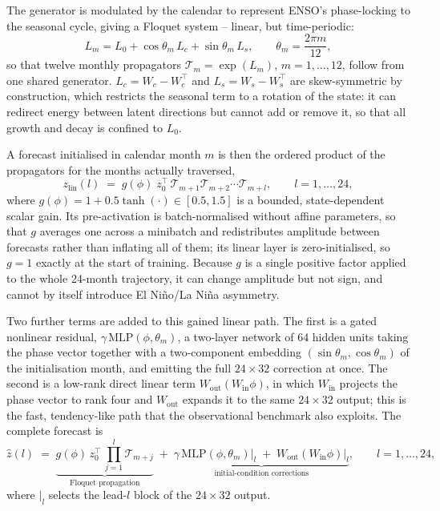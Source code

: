 The generator is modulated by the calendar to represent ENSO's phase-locking to the seasonal
cycle, giving a Floquet system -- linear, but time-periodic:
\[
L_m = L_0 + \cos\theta_m\,L_c + \sin\theta_m\,L_s, \qquad \theta_m = \frac{2\pi m}{12},
\]
so that twelve monthly propagators $\mathcal{T}_m = \exp(L_m)$, $m=1,\dots,12$, follow from one
shared generator. $L_c = W_c - W_c^{\top}$ and $L_s = W_s - W_s^{\top}$ are skew-symmetric by
construction, which restricts the seasonal term to a rotation of the state: it can redirect
energy between latent directions but cannot add or remove it, so that all growth and decay is
confined to $L_0$.

A forecast initialised in calendar month $m$ is then the ordered product of the propagators for
the months actually traversed,
\[
z_{\mathrm{lin}}(l) \;=\; g(\phi)\; z_0^{\top}\,
\mathcal{T}_{m+1}\mathcal{T}_{m+2}\cdots\mathcal{T}_{m+l}, \qquad l = 1,\dots,24,
\]
where $g(\phi) = 1 + 0.5\tanh(\cdot) \in [0.5,1.5]$ is a bounded, state-dependent scalar gain.
Its pre-activation is batch-normalised without affine parameters, so that $g$ averages one
across a minibatch and redistributes amplitude between forecasts rather than inflating all of
them; its linear layer is zero-initialised, so $g=1$ exactly at the start of training. Because
$g$ is a single positive factor applied to the whole 24-month trajectory, it can change
amplitude but not sign, and cannot by itself introduce El Ni\~no/La Ni\~na asymmetry.

Two further terms are added to this gained linear path. The first is a gated nonlinear
residual, $\gamma\,\mathrm{MLP}(\phi,\theta_m)$, a two-layer network of 64 hidden units taking
the phase vector together with a two-component embedding $(\sin\theta_m,\cos\theta_m)$ of the
initialisation month, and emitting the full $24\times32$ correction at once. The second is a
low-rank direct linear term $W_{\mathrm{out}}(W_{\mathrm{in}}\phi)$, in which $W_{\mathrm{in}}$
projects the phase vector to rank four and $W_{\mathrm{out}}$ expands it to the same
$24\times32$ output; this is the fast, tendency-like path that the observational benchmark also
exploits. The complete forecast is
\[
\hat z(l) \;=\;
\underbrace{g(\phi)\,z_0^{\top}\,\textstyle\prod_{j=1}^{l}\mathcal{T}_{m+j}}
           _{\text{Floquet propagation}}
\;+\; \underbrace{\gamma\,\mathrm{MLP}(\phi,\theta_m)\big|_l
\;+\; W_{\mathrm{out}}(W_{\mathrm{in}}\phi)\big|_l}_{\text{initial-condition corrections}},
\qquad l = 1,\dots,24,
\]
where $|_l$ selects the lead-$l$ block of the $24\times32$ output.

